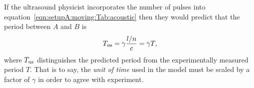 If the ultrasound physicist incorporates the  number of pulses into  equation~\ref{eqn:setupA:moving:Tab:acoustic}
then they would predict that the  period between $A$ and $B$ is
\begin{align}
 T_{\text{us}}= \gamma \frac{l/n}{c} = \gamma T,
\end{align}
where $T_{\text{us}}$ distinguishes the predicted period from the experimentally measured period $T$.
That is to say, the {\em  unit of time} used in the model must be scaled  by a factor of $\gamma$ in order to agree with experiment.













